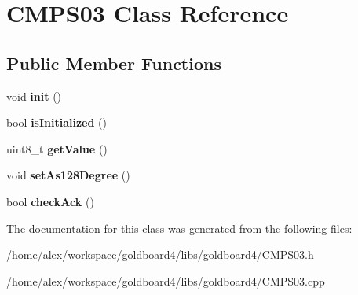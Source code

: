 \hypertarget{class_c_m_p_s03}{}\section{C\+M\+P\+S03 Class Reference}
\label{class_c_m_p_s03}
\subsection*{Public Member Functions}
\begin{DoxyCompactItemize}
\item 
void {\bfseries init} ()\hypertarget{class_c_m_p_s03_ac06595a1078df9e38bb5fbccaf459515}{}\label{class_c_m_p_s03_ac06595a1078df9e38bb5fbccaf459515}

\item 
bool {\bfseries is\+Initialized} ()\hypertarget{class_c_m_p_s03_a468491e6cff0e8456224d423a8e35204}{}\label{class_c_m_p_s03_a468491e6cff0e8456224d423a8e35204}

\item 
uint8\+\_\+t {\bfseries get\+Value} ()\hypertarget{class_c_m_p_s03_ab655cbe4fa5be60e9d9dbba7cd815865}{}\label{class_c_m_p_s03_ab655cbe4fa5be60e9d9dbba7cd815865}

\item 
void {\bfseries set\+As128\+Degree} ()\hypertarget{class_c_m_p_s03_a9c3183e6c8af4226b8291003a225b595}{}\label{class_c_m_p_s03_a9c3183e6c8af4226b8291003a225b595}

\item 
bool {\bfseries check\+Ack} ()\hypertarget{class_c_m_p_s03_ac6be4997575a04c73271ec40f2a34478}{}\label{class_c_m_p_s03_ac6be4997575a04c73271ec40f2a34478}

\end{DoxyCompactItemize}


The documentation for this class was generated from the following files\+:\begin{DoxyCompactItemize}
\item 
/home/alex/workspace/goldboard4/libs/goldboard4/C\+M\+P\+S03.\+h\item 
/home/alex/workspace/goldboard4/libs/goldboard4/C\+M\+P\+S03.\+cpp\end{DoxyCompactItemize}
